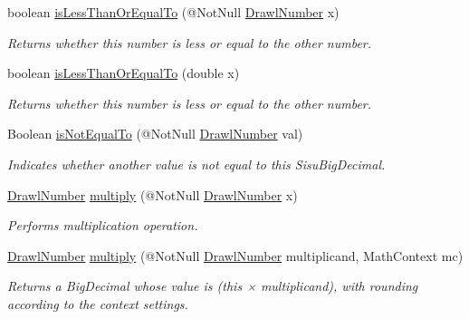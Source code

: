 \begin{DoxyCompactItemize}
boolean \hyperlink{classcom_1_1aarrelaakso_1_1drawl_1_1_drawl_number_a1e3af01437f8dfb6f7d81410da5b5cd6}{is\+Less\+Than\+Or\+Equal\+To} (@Not\+Null \hyperlink{classcom_1_1aarrelaakso_1_1drawl_1_1_drawl_number}{Drawl\+Number} x)
\begin{DoxyCompactList}\small\item\em Returns whether this number is less or equal to the other number. \end{DoxyCompactList}\item 
boolean \hyperlink{classcom_1_1aarrelaakso_1_1drawl_1_1_drawl_number_a1e3afd1ca075c1381ee90261a2e31694}{is\+Less\+Than\+Or\+Equal\+To} (double x)
\begin{DoxyCompactList}\small\item\em Returns whether this number is less or equal to the other number. \end{DoxyCompactList}\item 
Boolean \hyperlink{classcom_1_1aarrelaakso_1_1drawl_1_1_drawl_number_a48b4f9d41317fa1d11020b9fe4a489cf}{is\+Not\+Equal\+To} (@Not\+Null \hyperlink{classcom_1_1aarrelaakso_1_1drawl_1_1_drawl_number}{Drawl\+Number} val)
\begin{DoxyCompactList}\small\item\em Indicates whether another value is not equal to this Sisu\+Big\+Decimal. \end{DoxyCompactList}\item 
\hyperlink{classcom_1_1aarrelaakso_1_1drawl_1_1_drawl_number}{Drawl\+Number} \hyperlink{classcom_1_1aarrelaakso_1_1drawl_1_1_drawl_number_a72b791157519fe0971ffeaac63b33a1f}{multiply} (@Not\+Null \hyperlink{classcom_1_1aarrelaakso_1_1drawl_1_1_drawl_number}{Drawl\+Number} x)
\begin{DoxyCompactList}\small\item\em Performs multiplication operation. \end{DoxyCompactList}\item 
\hyperlink{classcom_1_1aarrelaakso_1_1drawl_1_1_drawl_number}{Drawl\+Number} \hyperlink{classcom_1_1aarrelaakso_1_1drawl_1_1_drawl_number_a70d594c3eaccb5b53b377dc9943913a8}{multiply} (@Not\+Null \hyperlink{classcom_1_1aarrelaakso_1_1drawl_1_1_drawl_number}{Drawl\+Number} multiplicand, Math\+Context mc)
\begin{DoxyCompactList}\small\item\em Returns a Big\+Decimal whose value is (this × multiplicand), with rounding according to the context settings. \end{DoxyCompactList}\item 

\end{DoxyCompactItemize}
